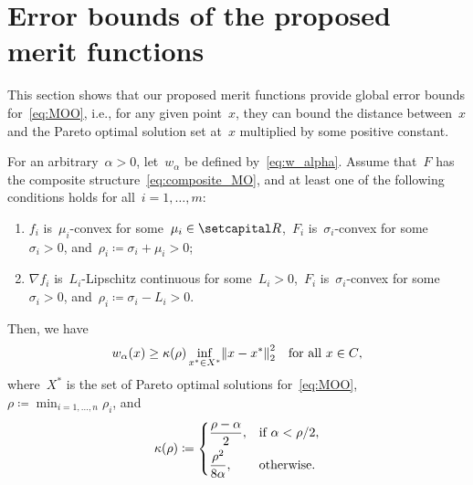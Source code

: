\documentclass[../main]{subfiles}
\begin{document}
\section{Error bounds of the proposed merit functions} \label{sec:merit:eb}
This section shows that our proposed merit functions provide global error bounds for~\cref{eq:MOO}, i.e., for any given point~$x$, they can bound the distance between~$x$ and the Pareto optimal solution set at~$x$ multiplied by some positive constant.
\begin{theorem} \label{thm:error bound}
    For an arbitrary~$\alpha > 0$, let~$w_\alpha$ be defined by~\cref{eq:w_alpha}.
    Assume that~$F$ has the composite structure~\cref{eq:composite_MO}, and at least one of the following conditions holds for all~$i = 1, \dots, m$:
    \begin{enumerate}
        \item $f_i$ is~$\mu_i$-convex for some~$\mu_i \in \setR$,~$F_i$ is~$\sigma_i$-convex for some~$\sigma_i > 0$, and~$\rho_i \coloneqq \sigma_i + \mu_i > 0$;
        \item $\nabla f_i$ is~$L_i$-Lipschitz continuous for some~$L_i > 0$,~$F_i$ is~$\sigma_i$-convex for some~$\sigma_i > 0$, and~$\rho_i \coloneqq \sigma_i - L_i > 0$.
    \end{enumerate}
    Then, we have
    \[
        w_\alpha(x) \ge \kappa(\rho) \inf_{x^\ast \in X^\ast} \norm*{x - x^\ast}_2^2 \forallcondition{x \in C}
    ,\]
    where~$X^\ast$ is the set of Pareto optimal solutions for~\cref{eq:MOO},~$\rho \coloneqq \min_{i = 1, \dots, n} \rho_i$, and
    \[
        \kappa(\rho) \coloneqq \begin{dcases}
            \frac{\rho - \alpha}{2}, & \text{if } \alpha < \rho / 2, \\
            \frac{\rho^2}{8 \alpha}, & \text{otherwise}
        .\end{dcases}
    \]
\end{theorem}
\end{document}
